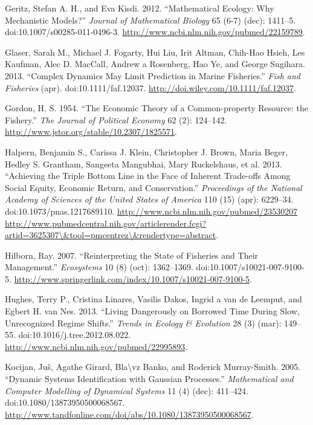 \documentclass[author-year, review]{elsarticle} %
\begin{document}
Geritz, Stefan A. H., and Eva Kisdi. 2012. ``Mathematical Ecology: Why
Mechanistic Models?'' \emph{Journal of Mathematical Biology} 65 (6-7)
(dec): 1411--5. doi:10.1007/s00285-011-0496-3.
\url{http://www.ncbi.nlm.nih.gov/pubmed/22159789}.

Glaser, Sarah M., Michael J. Fogarty, Hui Liu, Irit Altman, Chih-Hao
Hsieh, Les Kaufman, Alec D. MacCall, Andrew a Rosenberg, Hao Ye, and
George Sugihara. 2013. ``Complex Dynamics May Limit Prediction in Marine
Fisheries.'' \emph{Fish and Fisheries} (apr). doi:10.1111/faf.12037.
\url{http://doi.wiley.com/10.1111/faf.12037}.

Gordon, H. S. 1954. ``The Economic Theory of a Common-property Resource:
the Fishery.'' \emph{The Journal of Political Economy} 62 (2): 124--142.
\url{http://www.jstor.org/stable/10.2307/1825571}.

Halpern, Benjamin S., Carissa J. Klein, Christopher J. Brown, Maria
Beger, Hedley S. Grantham, Sangeeta Mangubhai, Mary Ruckelshaus, et al.
2013. ``Achieving the Triple Bottom Line in the Face of Inherent
Trade-offs Among Social Equity, Economic Return, and Conservation.''
\emph{Proceedings of the National Academy of Sciences of the United
States of America} 110 (15) (apr): 6229--34.
doi:10.1073/pnas.1217689110.
\href{http://www.ncbi.nlm.nih.gov/pubmed/23530207 http://www.pubmedcentral.nih.gov/articlerender.fcgi?artid=3625307/\&tool=pmcentrez/\&rendertype=abstract}{http://www.ncbi.nlm.nih.gov/pubmed/23530207
http://www.pubmedcentral.nih.gov/articlerender.fcgi?artid=3625307\textbackslash{}\&tool=pmcentrez\textbackslash{}\&rendertype=abstract}.

Hilborn, Ray. 2007. ``Reinterpreting the State of Fisheries and Their
Management.'' \emph{Ecosystems} 10 (8) (oct): 1362--1369.
doi:10.1007/s10021-007-9100-5.
\url{http://www.springerlink.com/index/10.1007/s10021-007-9100-5}.

Hughes, Terry P., Cristina Linares, Vasilis Dakos, Ingrid a van de
Leemput, and Egbert H. van Nes. 2013. ``Living Dangerously on Borrowed
Time During Slow, Unrecognized Regime Shifts.'' \emph{Trends in Ecology
\& Evolution} 28 (3) (mar): 149--55. doi:10.1016/j.tree.2012.08.022.
\url{http://www.ncbi.nlm.nih.gov/pubmed/22995893}.

Kocijan, Juš, Agathe Girard, Bla\textbackslash{}vz Banko, and Roderick
Murray-Smith. 2005. ``Dynamic Systems Identification with Gaussian
Processes.'' \emph{Mathematical and Computer Modelling of Dynamical
Systems} 11 (4) (dec): 411--424. doi:10.1080/13873950500068567.
\url{http://www.tandfonline.com/doi/abs/10.1080/13873950500068567}.
\end{document}
